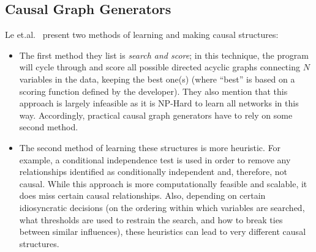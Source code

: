 \documentclass[]{svjour3}
\begin{document}
 \subsection{Causal Graph Generators}
  Le et.al.~\cite{PCParalell}  present two methods of learning and making causal structures:
 \begin{itemize}
 \item
The first method they list is {\em search and score}; in this technique, the program will cycle through and score all possible directed acyclic graphs connecting $N$ variables in the data,  keeping the best one(s) (where ``best'' is based on a scoring function defined by the developer). They also mention that this approach is largely infeasible as it is NP-Hard to learn all networks in this way\cite{PCParalell}.  Accordingly,
 practical causal graph generators have to rely on some second method.
      \item 
 The second method of learning these structures is more heuristic. For example,
 a conditional independence test is used in order to remove any relationships identified as conditionally independent and, therefore, not causal. 
 While this approach is more computationally feasible and scalable,
 it does miss certain causal relationships. Also, depending on certain
 idiosyncratic decisions (on the ordering within which variables are searched,
 what thresholds are used to restrain the search, and how to break ties between
 similar influences), these heuristics can lead to very different causal
 structures. 
  \end{itemize}
 
\end{document}
